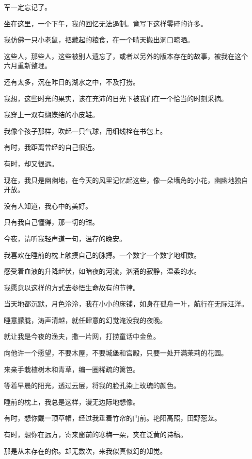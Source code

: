 \documentclass[12pt,a4paper]{article}
\def\blankrev{\vspace{1ex}}									%
\begin{document}
		军一定忘记了。


		\blankrev
		坐在这里，一个下午，我的回忆无法遏制。竟写下这样零碎的许多。\par
		我仿佛一只小老鼠，把藏起的粮食，在一个晴天搬出洞口晾晒。\par
		这些人，那些人，这些被别人遗忘了，或者以另外的版本存在的故事，被我在这个六月重新整理。\par
		还有太多，沉在昨日的湖水之中，不及打捞。\par
		我想，这些时光的果实，该在充沛的日光下被我们在一个恰当的时刻采摘。

		我穿上一双有蝴蝶结的小皮鞋。\par
		我像个孩子那样，吹起一只气球，用细线栓在书包上。

		有时，我距离曾经的自己很近。\par
		有时，却又很远。

		现在，我只是幽幽地，在今天的风里记忆起这些，像一朵墙角的小花，幽幽地独自开放。\par
		没有人知道，我心中的美好。\par
		只有我自己懂得，那一切的甜。

	\endwriting




		今夜，请听我轻声道一句，温存的晚安。

		\blankrev
		我喜欢在睡前的枕上触摸自己的脉搏。一个数字一个数字地细数。\par
		感受着血液的升降起伏，如暗夜的河流，汹涌的寂静，温柔的水。

		我愿意以这样的方式去参悟生命故有的节律。

		当天地都沉默，月色泠泠，我在小小的床铺，如身在孤舟一叶，航行在无际汪洋。\par
		睡意朦胧，涛声清越，就任肆意的幻觉淹没我的夜晚。\par
		就让我是今夜的渔夫，撒一片网，打捞童话中金鱼。\par
		向他许一个愿望，不要木屋，不要城堡和宫殿，只要一处开满茉莉的花园。\par
		来亲手栽植树木和青草，编一圈稀疏的篱笆。\par
		等着早晨的阳光，透过云层，将我的脸孔染上玫瑰的颜色。

		睡前的枕上，我总是这样，漫无边际地想像。

		有时，想你戴一顶草帽，经过我垂着竹帘的门前。艳阳高照，田野葱茏。\par
		有时，想你在远方，寄来窗前的寒梅一朵，夹在泛黄的诗稿。\par
		那是从未存在的你。却无数次，来我似真似幻的知觉。
\end{document}
